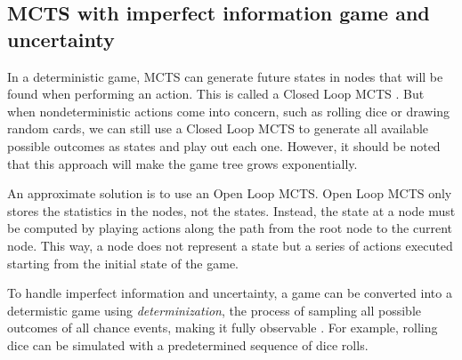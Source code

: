 
\subsection{MCTS with imperfect information game and uncertainty} \label{handling-uncertainty}

In a deterministic game, MCTS can generate future states in nodes that will be found when performing an action. This is called a Closed Loop MCTS \cite{Perez_Liebana_2015}. But when nondeterministic actions come into concern, such as rolling dice or drawing random cards, we can still use a Closed Loop MCTS to generate all available possible outcomes as states and play out each one. However, it should be noted that this approach will make the game tree grows exponentially. 

An approximate solution is to use an Open Loop MCTS. Open Loop MCTS only stores the statistics in the nodes, not the states. Instead, the state at a node must be computed by playing actions along the path from the root node to the current node. This way, a node does not represent a state but a series of actions executed starting from the initial state of the game.

To handle imperfect information and uncertainty, a game can be converted into a determistic game using \textit{determinization}, the process of sampling all possible outcomes of all chance events, making it fully observable \cite{mcts-survey}. For example, rolling dice can be simulated with a predetermined sequence of dice rolls.



